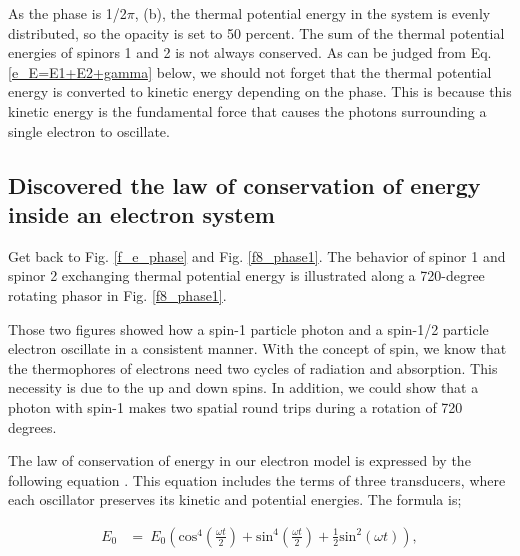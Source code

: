 \documentclass[%
 reprint,
 amsmath,amssymb,
 aps,
]{revtex4-1}
\numberwithin{equation}{section}%
\begin{document}
As the phase is 1/2$\pi$, (b), the thermal potential energy in the system is evenly distributed, so the opacity is set to 50 percent. The sum of the thermal potential energies of spinors 1 and 2 is not always conserved. As can be judged from Eq. \ref{e_E=E1+E2+gamma} below, we should not forget that the thermal potential energy is converted to kinetic energy depending on the phase. This is because this kinetic energy is the fundamental force that causes the photons surrounding a single electron to oscillate.


\subsection{Discovered the law of conservation of energy inside an electron system}
\label{Discovered the law of conservation of energy inside the electron}


Get back to Fig. \ref{f_e_phase} and Fig. \ref{f8_phase1}. The behavior of spinor 1 and spinor 2 exchanging thermal potential energy is illustrated along a 720-degree rotating phasor in Fig. \ref{f8_phase1}.


Those two figures showed how a spin-1 particle photon and a spin-1/2 particle electron oscillate in a consistent manner. With the concept of spin, we know that the thermophores of electrons need two cycles of radiation and absorption. This necessity is due to the up and down spins. In addition, we could show that a photon with spin-1 makes two spatial round trips during a rotation of 720 degrees.


The law of conservation of energy in our electron model is expressed by the following equation \cite{Hanamura1}. This equation includes the terms of three transducers, where each oscillator preserves its kinetic and potential energies. The formula is;

    \begin{equation}
        \begin{split}
            E_{0}
            &= \ E_{0} \left( \mathrm{cos}^{4} \left( \frac{\omega t}{2} \right) + \mathrm{sin}^{4} \left( \frac{\omega t}{2} \right) + \frac{1}{2} \mathrm{sin}^{2} (\omega t) \right)
            ,
        \end{split}
        \label{e_E=E1+E2+gamma}
    \end{equation}
\end{document}
